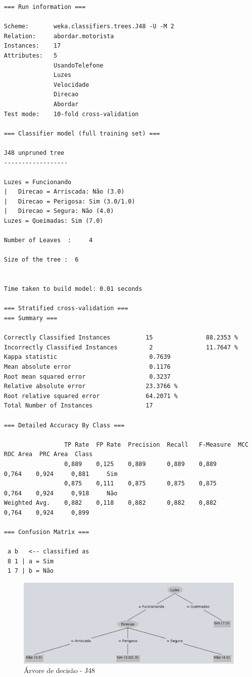 \documentclass[
    article,            %
    11pt,               %
    oneside,            %
    a4paper,            %
    english,            %
    brazil,             %
    sumario=tradicional,
    ]{abntex2}
\begin{document}
\begin{Verbatim}[frame=single, fontsize=\tiny]
=== Run information ===

Scheme:       weka.classifiers.trees.J48 -U -M 2
Relation:     abordar.motorista
Instances:    17
Attributes:   5
              UsandoTelefone
              Luzes
              Velocidade
              Direcao
              Abordar
Test mode:    10-fold cross-validation

=== Classifier model (full training set) ===

J48 unpruned tree
------------------

Luzes = Funcionando
|   Direcao = Arriscada: Não (3.0)
|   Direcao = Perigosa: Sim (3.0/1.0)
|   Direcao = Segura: Não (4.0)
Luzes = Queimadas: Sim (7.0)

Number of Leaves  :     4

Size of the tree :  6


Time taken to build model: 0.01 seconds

=== Stratified cross-validation ===
=== Summary ===

Correctly Classified Instances          15               88.2353 %
Incorrectly Classified Instances         2               11.7647 %
Kappa statistic                          0.7639
Mean absolute error                      0.1176
Root mean squared error                  0.3237
Relative absolute error                 23.3766 %
Root relative squared error             64.2071 %
Total Number of Instances               17     

=== Detailed Accuracy By Class ===

                 TP Rate  FP Rate  Precision  Recall   F-Measure  MCC      ROC Area  PRC Area  Class
                 0,889    0,125    0,889      0,889    0,889      0,764    0,924     0,881     Sim
                 0,875    0,111    0,875      0,875    0,875      0,764    0,924     0,918     Não
Weighted Avg.    0,882    0,118    0,882      0,882    0,882      0,764    0,924     0,899     

=== Confusion Matrix ===

 a b   <-- classified as
 8 1 | a = Sim
 1 7 | b = Não
\end{Verbatim}

\begin{figure}[H]
    \label{j48-decision-tree-2}
    \caption{Árvore de decisão - J48}
    \includegraphics[width=\textwidth]{imgs/exer3-j48-tree.pdf}
\end{figure}
\end{document}
